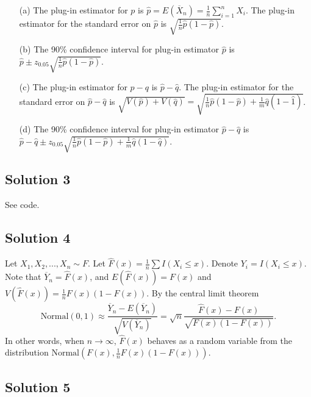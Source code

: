 \begin{itemize}
    \item[(a)] The plug-in estimator for $p$ is $\hat{p} = E(\overline{X}_n) = \frac{1}{n} \sum_{i = 1}^n X_i$.
        The plug-in estimator for the standard error on $\hat{p}$ is $\sqrt{\frac{1}{n} \hat{p}(1 - \hat{p})}$.
    \item[(b)] The 90\% confidence interval for plug-in estimator $\hat{p}$ is $\hat{p} \pm z_{0.05} \sqrt{\frac{1}{n} \hat{p}(1 - \hat{p})}$.
    \item[(c)] The plug-in estimator for $p - q$ is $\hat{p} - \hat{q}$.
        The plug-in estimator for the standard error on $\hat{p} - \hat{q}$ is $\sqrt{V(\hat{p}) + V(\hat{q})} = \sqrt{\frac{1}{n} \hat{p}(1 - \hat{p}) + \frac{1}{m} \hat{q}(1 - \hat{1})}$.
    \item[(d)] The 90\% confidence interval for plug-in estimator $\hat{p} - \hat{q}$ is $\hat{p} - \hat{q} \pm z_{0.05} \sqrt{\frac{1}{n} \hat{p}(1 - \hat{p}) + \frac{1}{m} \hat{q}(1 - \hat{q})}$.
\end{itemize}


\subsection*{Solution 3}

See code.


\subsection*{Solution 4}

Let $X_1, X_2, ..., X_n \sim F$.
Let $\hat{F}(x) = \frac{1}{n} \sum I(X_i \leq x)$.
Denote $Y_i = I(X_i \leq x)$.
Note that $\overline{Y}_n = \hat{F}(x)$, and $E(\hat{F}(x)) = F(x)$ and $V(\hat{F}(x)) = \frac{1}{n} F(x)(1 - F(x))$.
By the central limit theorem
\begin{equation*}
    \mathrm{Normal}(0, 1) \approx \frac{\overline{Y}_n - E(\overline{Y}_n)}{\sqrt{V(\overline{Y}_n)}}
        = \sqrt{n} \frac{\hat{F}(x) - F(x)}{\sqrt{F(x)(1 - F(x))}}.
\end{equation*}
In other words, when $n \to \infty$, $\hat{F}(x)$ behaves as a random variable from the distribution $\mathrm{Normal}(F(x), \frac{1}{n} F(x)(1 - F(x)))$.


\subsection*{Solution 5}

